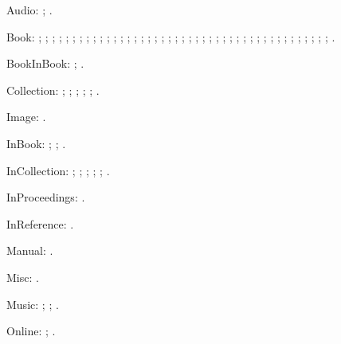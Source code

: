 \documentclass[a4paper,12pt]{report}
\begin{document}
Audio: \autocite{greek:filmstrip}; \autocite{weed:flatiron}.

Book: \autocite{barrows:reading}; \autocite{churchill:letters};
\autocite{cohen:schiff}; \autocite{cotton:manufacture};
\autocite{creasey:ashe:blast}; \autocite{creasey:morton:hide};
\autocite{creasey:york:death}; \autocite{davenport:attention};
\autocite{feydeau:farces}; \autocite{furet:passing:eng};
\autocite{furet:passing:fr}; \autocite{hopp:attalid};
\autocite{howell:marriage}; \autocite{lach:asia};
\autocite{lecarre:quest}; \autocite{levistrauss:savage};
\autocite{lynch:webstyle}; \autocite{maisonneuve:relations};
\autocite{mchugh:wake:15}; \autocite{menchu:crossing};
\autocite{meredith:letters}; \autocite{michelangelo:poems};
\autocite{mla:style}; \autocite{natrecoff:camera};
\autocite{palmatary:pottery}; \autocite{pelikan:christian};
\autocite{rodman:walk}; \autocite{schellinger:novel};
\autocite{sechzer:women}; \autocite{sereny:cries};
\autocite{soltes:georgia}; \autocite{stendhal:parma};
\autocite{suangtho:tectona}; \autocite{thompson:making};
\autocite{tillich:system}; \autocite{times:guide};
\autocite{turabian:manual}; \autocite{walker:columbia};
\autocite{wauchope:ceramics}; \autocite{weber:saugetiere};
\autocite{weresz}; \autocite{white:total};
\autocite{wright:evolution}; \autocite{wright:theory}.

BookInBook: \autocite{bernhard:boris}; \autocite{bernhard:ritter}.

Collection: \autocite{brush:ornithology};
\autocite{harley:cartography}; \autocite{harley:ancient:cart};
\autocite{kamrany:economic}; \autocite{prairie:state};
\autocite{zukowsky:chicago}.

Image: \autocite{bedford:photo}.

InBook: \autocite{ashbrook:brain}; \autocite{phibbs:diary};
\autocite{will:cohere}.

InCollection: \autocite{centinel:letters}; \autocite{ellet:galena};
\autocite{keating:dearborn}; \autocite{lippincott:chicago};
\autocite{sirosh:visualcortex}; \autocite{wiens:avian}.

InProceedings: \autocite{frede:inproc}.

InReference: \autocite[absolute]{oed:cdrom}.

Manual: \autocite{dyna:browser}.

Misc: \autocite{roosevelt:speech:trad}.

Music: \autocite{floyd:atom}; \autocite{mozart:figaro};
\autocite{rubinstein:chopin}.

Online: \autocite{harwood:biden}; \autocite{powell:email}.
\end{document}
